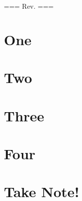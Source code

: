 \documentclass[12pt]{book}
\begin{document}
\noindent
=== Rev. \rev ===

\newpage


\part{One}

\part{Two}

\part{Three}

\part{Four}

\part{Take Note!}


\end{document}
